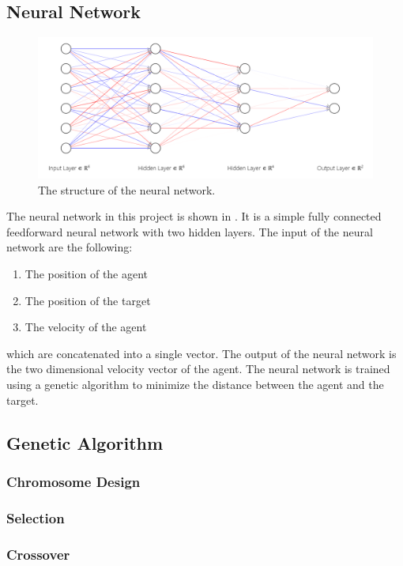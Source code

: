 \documentclass[sigconf]{acmart}
\begin{document}
\subsection{Neural Network}
\begin{figure}[H]
  \centering
  \includegraphics[width=0.95\linewidth]{NeuralNetwork.png}
  \caption{The structure of the neural network.}
  \label{fig:neural_network}
\end{figure}
The neural network in this project is shown in . It is a simple fully connected feedforward neural network with two hidden layers. The input of the neural network are the following:
\begin{enumerate}
  \item The position of the agent
  \item The position of the target
  \item The velocity of the agent
\end{enumerate}
which are concatenated into a single vector.
The output of the neural network is the two dimensional velocity vector of the agent. The neural network is trained using a genetic algorithm to minimize the distance between the agent and the target. 

\subsection{Genetic Algorithm}
\subsubsection{Chromosome Design}
\subsubsection{Selection}
\subsubsection{Crossover}
\end{document}

